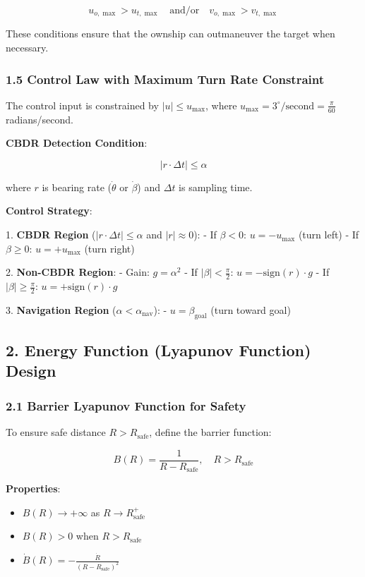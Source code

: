 \documentclass[11pt,a4paper]{article}
\numberwithin{equation}{section}
\begin{document}
\[
u_{o,\max} > u_{t,\max} \quad \text{and/or} \quad v_{o,\max} > v_{t,\max}
\]

These conditions ensure that the ownship can outmaneuver the target when necessary.

\subsubsection{1.5 Control Law with Maximum Turn Rate Constraint}

The control input is constrained by $|u| \leq u_{\max}$, where $u_{\max} = 3^\circ/\mathrm{second} = \frac{\pi}{60}$ radians/second.

\textbf{CBDR Detection Condition}:

\[
|r \cdot \Delta t| \leq \alpha
\]

where $r$ is bearing rate ($\dot{\theta}$ or $\dot{\beta}$) and $\Delta t$ is sampling time.

\textbf{Control Strategy}:

1. \textbf{CBDR Region} ($|r \cdot \Delta t| \leq \alpha$ and $|r| \approx 0$):
   - If $\beta < 0$: $u = -u_{\max}$ (turn left)
   - If $\beta \geq 0$: $u = +u_{\max}$ (turn right)

2. \textbf{Non-CBDR Region}:
   - Gain: $g = \alpha^2$
   - If $|\beta| < \frac{\pi}{2}$: $u = -\text{sign}(r) \cdot g$
   - If $|\beta| \geq \frac{\pi}{2}$: $u = +\text{sign}(r) \cdot g$

3. \textbf{Navigation Region} ($\alpha < \alpha_{\text{nav}}$):
   - $u = \beta_{\text{goal}}$ (turn toward goal)

\subsection{2. Energy Function (Lyapunov Function) Design}

\subsubsection{2.1 Barrier Lyapunov Function for Safety}

To ensure safe distance $R > R_{\text{safe}}$, define the barrier function:

\[
B(R) = \frac{1}{R - R_{\text{safe}}}, \quad R > R_{\text{safe}}
\]

\textbf{Properties}:
\begin{itemize}
\item $B(R) \to +\infty$ as $R \to R_{\text{safe}}^+$
\item $B(R) > 0$ when $R > R_{\text{safe}}$
\item $\dot{B}(R) = -\frac{\dot{R}}{(R - R_{\text{safe}})^2}$
\end{itemize}
\end{document}
